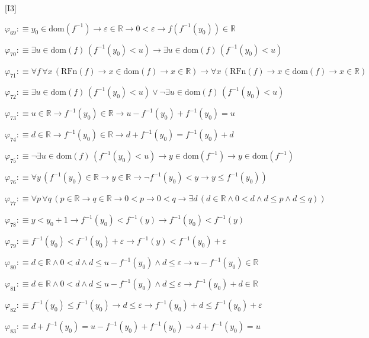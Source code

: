 \begin{fullproof}{[I3]}
\begin{abbrevlist}
\item $\varphi_{69} :\equiv y_{0} \in \mathrm{dom}(f^{-1}) \to \varepsilon \in \mathbb{R} \to 0 < \varepsilon \to f(f^{-1}(y_{0})) \in \mathbb{R}$
\item $\varphi_{70} :\equiv \exists u \in \mathrm{dom}(f)\,(f^{-1}(y_{0}) < u) \to \exists u \in \mathrm{dom}(f)\,(f^{-1}(y_{0}) < u)$
\item $\varphi_{71} :\equiv \forall f\,\forall x\,(\mathrm{RFn}(f) \to x \in \mathrm{dom}(f) \to x \in \mathbb{R}) \to \forall x\,(\mathrm{RFn}(f) \to x \in \mathrm{dom}(f) \to x \in \mathbb{R})$
\item $\varphi_{72} :\equiv \exists u \in \mathrm{dom}(f)\,(f^{-1}(y_{0}) < u) \lor \neg \exists u \in \mathrm{dom}(f)\,(f^{-1}(y_{0}) < u)$
\item $\varphi_{73} :\equiv u \in \mathbb{R} \to f^{-1}(y_{0}) \in \mathbb{R} \to u - f^{-1}(y_{0}) + f^{-1}(y_{0}) = u$
\item $\varphi_{74} :\equiv d \in \mathbb{R} \to f^{-1}(y_{0}) \in \mathbb{R} \to d + f^{-1}(y_{0}) = f^{-1}(y_{0}) + d$
\item $\varphi_{75} :\equiv \neg \exists u \in \mathrm{dom}(f)\,(f^{-1}(y_{0}) < u) \to y \in \mathrm{dom}(f^{-1}) \to y \in \mathrm{dom}(f^{-1})$
\item $\varphi_{76} :\equiv \forall y\,(f^{-1}(y_{0}) \in \mathbb{R} \to y \in \mathbb{R} \to \neg f^{-1}(y_{0}) < y \to y \leq f^{-1}(y_{0}))$
\item $\varphi_{77} :\equiv \forall p\,\forall q\,(p \in \mathbb{R} \to q \in \mathbb{R} \to 0 < p \to 0 < q \to \exists d\,(d \in \mathbb{R} \land 0 < d \land d \leq p \land d \leq q))$
\item $\varphi_{78} :\equiv y < y_{0} + 1 \to f^{-1}(y_{0}) < f^{-1}(y) \to f^{-1}(y_{0}) < f^{-1}(y)$
\item $\varphi_{79} :\equiv f^{-1}(y_{0}) < f^{-1}(y_{0}) + \varepsilon \to f^{-1}(y) < f^{-1}(y_{0}) + \varepsilon$
\item $\varphi_{80} :\equiv d \in \mathbb{R} \land 0 < d \land d \leq u - f^{-1}(y_{0}) \land d \leq \varepsilon \to u - f^{-1}(y_{0}) \in \mathbb{R}$
\item $\varphi_{81} :\equiv d \in \mathbb{R} \land 0 < d \land d \leq u - f^{-1}(y_{0}) \land d \leq \varepsilon \to f^{-1}(y_{0}) + d \in \mathbb{R}$
\item $\varphi_{82} :\equiv f^{-1}(y_{0}) \leq f^{-1}(y_{0}) \to d \leq \varepsilon \to f^{-1}(y_{0}) + d \leq f^{-1}(y_{0}) + \varepsilon$
\item $\varphi_{83} :\equiv d + f^{-1}(y_{0}) = u - f^{-1}(y_{0}) + f^{-1}(y_{0}) \to d + f^{-1}(y_{0}) = u$

\end{abbrevlist}
\end{fullproof}
